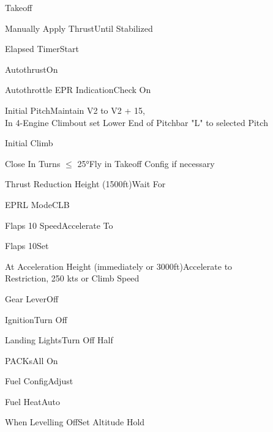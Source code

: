 \documentclass[sim-use, blue_items]{checklist}
\begin{document}
\begin{checklist}{Takeoff}
	\item{Manually Apply Thrust}{Until Stabilized}
	\item{Elapsed Timer}{Start}
	\item{Autothrust}{On}
	\item{Autothrottle EPR Indication}{Check On}
	\item{Initial Pitch}{Maintain V2 to V2 + 15,\\In 4-Engine Climbout set Lower End of Pitchbar "L" to selected Pitch}
\end{checklist}

\begin{checklist}{Initial Climb}
	\item{Close In Turns $\leq$ 25°}{Fly in Takeoff Config if necessary}
	\item{Thrust Reduction Height (1500ft)}{Wait For}
	\item{EPRL Mode}{CLB}
	 {
		\item{Flaps 10 Speed}{Accelerate To}
		\item{Flaps 10}{Set}
	}
	\item{At Acceleration Height (immediately or 3000ft)}{Accelerate to\\Restriction, 250 kts or Climb Speed}
	 {
		\item{Gear Lever}{Off}
		\item{Ignition}{Turn Off}
		\item{Landing Lights}{Turn Off Half}
		\item{PACKs}{All On}
		\item{Fuel Config}{Adjust}
		\item{Fuel Heat}{Auto}
	}
	\item{When Levelling Off}{Set Altitude Hold}
\end{checklist}
\end{document}
